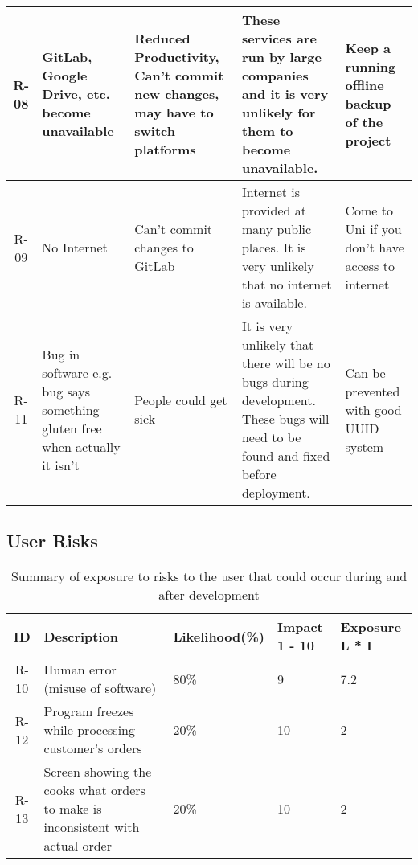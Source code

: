 \begin{table}[H]
\begin{tabularx}{\linewidth}{|c|X|X|X|X|}
    \hline
    R-08 & GitLab, Google Drive, etc. become unavailable & Reduced Productivity, Can’t commit new changes, may have to switch platforms & These services are run by large companies and it is very unlikely for them to become unavailable. & Keep a running offline backup of the project \\
    \hline
    R-09 & No Internet & Can’t commit changes to GitLab & Internet is provided at many public places. It is very unlikely that no internet is available. & Come to Uni if you don’t have access to internet \\
    \hline
    R-11 & Bug in software e.g. bug says something gluten free when actually it isn’t & People could get sick & It is very unlikely that there will be no bugs during development. These bugs will need to be found and fixed before deployment. & Can be prevented with good UUID system \\
    \hline
\end{tabularx}
\end{table}

\subsection{User Risks}

\begin{table}[!ht]
\centering
\caption{Summary of exposure to risks to the user that could occur during and after development}
\begin{tabularx}{\linewidth}{|c|X|X|X|X|}
	\hline
    ID & Description & Likelihood(\%) & Impact
    1 - 10 & Exposure
    L * I \\
    \hline
    R-10 & Human error (misuse of software) & 80\% & 9 & 7.2 \\
    \hline
    R-12 & Program freezes while processing customer’s orders & 20\% & 10 & 2 \\
    \hline
    R-13 & Screen showing the cooks what orders to make is inconsistent with actual order & 20\% & 10 & 2 \\
    \hline
\end{tabularx}
\end{table}


